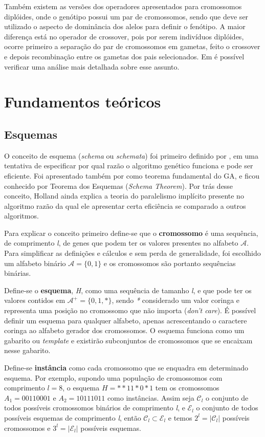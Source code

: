 Também existem as versões dos operadores apresentados para cromossomos diplóides, onde o genótipo possui um par de cromossomos, sendo que deve ser utilizado o aspecto de dominância dos alelos para definir o fenótipo. A maior diferença está no operador de crossover, pois por serem indivíduos diplóides, ocorre primeiro a separação do par de cromossomos em gametas, feito o crossover e depois recombinação entre os gametas dos pais selecionados. Em  é possível verificar uma análise mais detalhada sobre esse assunto.

\section{Fundamentos teóricos}
\subsection{Esquemas}
\label{sec:esquemas}
O conceito de esquema (\textit{schema} ou \textit{schemata}) foi primeiro definido por \citeauthor{Holland1992}, em uma tentativa de especificar por qual razão o algoritmo genético funciona e pode ser eficiente. Foi apresentado também por \citeauthor{Goldberg1989} como teorema fundamental do GA, e ficou conhecido por Teorema dos Esquemas (\textit{Schema Theorem}). Por trás desse conceito, Holland ainda explica a teoria do paralelismo implícito presente no algoritmo razão da qual ele apresentar certa eficiência se comparado a outros algoritmos.

Para explicar o conceito primeiro define-se que o \textbf{cromossomo} é uma sequência, de comprimento \textit{l}, de genes que podem ter os valores presentes no alfabeto \(\mathcal{A}\). Para simplificar as definições e cálculos e sem perda de generalidade, foi escolhido um alfabeto binário \(\mathcal{A} = \{0, 1\}\) e os cromossomos são portanto sequências binárias. 

Define-se o \textbf{esquema}, \textit{H}, como uma sequência de tamanho \textit{l}, e que pode ter os valores contidos em \(\mathcal{A}^+ = \{0, 1 , *\}\), sendo \textit{*} considerado um valor coringa e representa uma posição no cromossomo que não importa (\textit{don't care}). É possível definir um esquema para qualquer alfabeto, apenas acrescentando o caractere coringa ao alfabeto gerador dos cromossomos. O esquema funciona como um gabarito ou \textit{template} e existirão subconjuntos de cromossomos que se encaixam nesse gabarito. 

Define-se \textbf{instância} como cada cromossomo que se enquadra em determinado esquema. Por exemplo, supondo uma população de cromossomos com comprimento \(l=8\), o esquema \mbox{\(H=**11*0*1\)} tem os cromossomos \(A_1=00110001\) e \(A_2=10111011\) como instâncias. Assim seja \(\mathcal{C}_l\) o conjunto de todos possíveis cromossomos binários de comprimento \textit{l}, e \(\mathcal{E}_l\) o conjunto de todos possíveis esquemas de comprimento \textit{l}, então \(\mathcal{C}_l \subset \mathcal{E}_l \) e temos \(2^l = |\mathcal{C}_l|\) possíveis cromossomos e \(3^l = |\mathcal{E}_l|\) possíveis esquemas.

